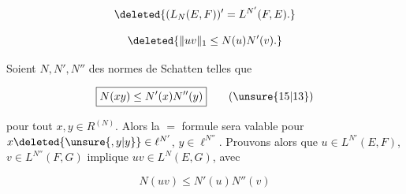 \[
\deleted{(L_N(E,F))'=L^{N'}(F,E).}
\]


\[
\deleted{\lVert uv\rVert_1\leq N(u)N'(v).}
\]

 Soient $N,N',N''$ des normes de Schatten telles que

\[
\boxed{N(xy)\leq N'(x)N''(y)}\tag*{(\unsure{15|13})}
\]

pour tout $x,y\in R^{(N)}$. Alors la $=$ formule sera valable pour $x\deleted{\unsure{,y|y}}\in\ell^{N'}$, $y\in\ell^{N''}$. Prouvons alors que $u\in L^{N'}(E,F)$, $v\in L^{N''}(F,G)$ implique $uv\in L^N(E,G)$, avec

\[
\boxed{N(uv)\leq N'(u)N''(v)}\tag*{(16)}
\]
